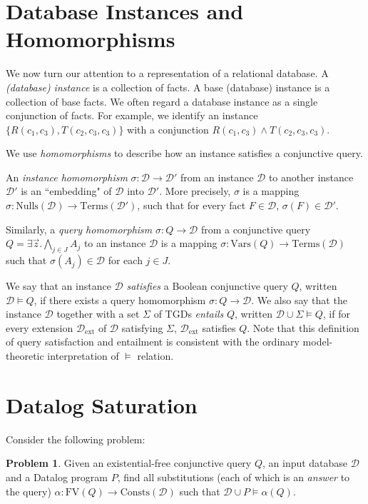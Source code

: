 \documentclass[12pt]{report}
\theoremstyle{plain}
\theoremstyle{definition}
\newtheorem{problem}[theorem]{Problem}
\def\FV{{\mathrm{FV}}}
\def\Vars{{\mathrm{Vars}}}
\def\Consts{{\mathrm{Consts}}}
\def\Terms{{\mathrm{Terms}}}
\def\Nulls{{\mathrm{Nulls}}}
\begin{document}
\section{Database Instances and Homomorphisms}

We now turn our attention to a representation of a relational database. A \emph{(database) instance} is a collection of facts. A base (database) instance is a collection of base facts. We often regard a database instance as a single conjunction of facts. For example, we identify an instance $\{ R(c_1, c_3), T(c_2, c_3, c_3) \}$ with a conjunction $R(c_1, c_3) \wedge T(c_2, c_3, c_3)$.

We use \emph{homomorphisms} to describe how an instance satisfies a conjunctive query.

An \emph{instance homomorphism} $\sigma: \mathcal{D} \rightarrow \mathcal{D}'$ from an instance $\mathcal{D}$ to another instance $\mathcal{D}'$ is an ``embedding" of $\mathcal{D}$ into $\mathcal{D}'$. More precisely, $\sigma$ is a mapping $\sigma: \Nulls(\mathcal{D}) \rightarrow \Terms(\mathcal{D}')$, such that for every fact $F \in \mathcal{D}$, $\sigma(F) \in \mathcal{D}'$.

Similarly, a \emph{query homomorphism} $\sigma: Q \rightarrow \mathcal{D}$ from a conjunctive query $Q = \exists \vec{z}. \bigwedge_{j \in J} A_j$ to an instance $\mathcal{D}$ is a mapping $\sigma: \Vars(Q) \rightarrow \Terms(\mathcal{D})$ such that $\sigma(A_j) \in \mathcal{D}$ for each $j \in J$.

We say that an instance $\mathcal{D}$ \emph{satisfies} a Boolean conjunctive query $Q$, written $\mathcal{D} \models Q$, if there exists a query homomorphism $\sigma: Q \rightarrow \mathcal{D}$. We also say that the instance $\mathcal{D}$ together with a set $\Sigma$ of TGDs \emph{entails} $Q$, written $\mathcal{D} \cup \Sigma \models Q$, if for every extension $\mathcal{D}_\mathrm{ext}$ of $\mathcal{D}$ satisfying $\Sigma$, $\mathcal{D}_\mathrm{ext}$ satisfies $Q$. Note that this definition of query satisfaction and entailment is consistent with the ordinary model-theoretic interpretation of $\models$ relation.

\section{Datalog Saturation}

Consider the following problem:

\begin{problem}
   Given an existential-free conjunctive query $Q$, an input database $\mathcal{D}$ and a Datalog program $P$, find all substitutions (each of which is an \emph{answer} to the query) $\alpha: \FV(Q) \rightarrow \Consts(\mathcal{D})$ such that $\mathcal{D} \cup P \models \alpha(Q)$.
\end{problem}
\end{document}
